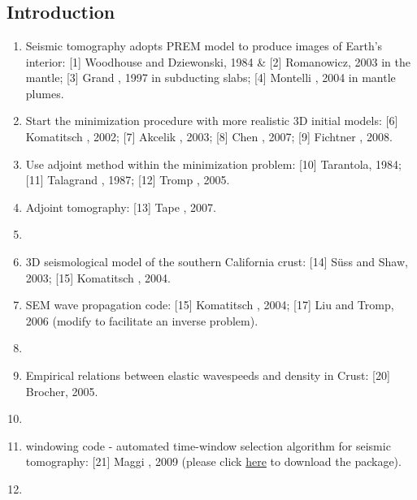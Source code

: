 \renewcommand{\pmk}{Tape\_2009\_S\_Adjoint at SCC}
\renewcommand{\prf}{FWI/\pmk.pdf}
\renewcommand{\pti}{Adjoint tomography of the southern California crust}
\renewcommand{\pay}{Carl Tape, Qinya Liu, and Alessia Maggi \etal, 2009}
\renewcommand{\pjo}{Science}
\renewcommand{\pda}{2016/11/27 Sun.}

\section{\pinfo}
\subsection{Introduction}
\begin{enumerate}[\hspace{10mm}*]
  \item Seismic tomography adopts PREM model to produce images of Earth's interior:
    [1] Woodhouse and Dziewonski, 1984 \& [2] Romanowicz, 2003 in the mantle;
    [3] Grand \etal, 1997 in subducting slabs; [4] Montelli \etal, 2004 in mantle plumes.
  \item Start the minimization procedure with more realistic 3D initial models:
    [6] Komatitsch \etal, 2002; [7] Akcelik \etal, 2003;
    [8] Chen \etal, 2007; [9] Fichtner \etal, 2008.
  \item Use adjoint method within the minimization problem:
    [10] Tarantola, 1984; [11] Talagrand \etal, 1987; [12] Tromp \etal, 2005.
  \item Adjoint tomography: [13] Tape \etal, 2007.
  \item \sline
  \item 3D seismological model of the southern California crust:
    [14] S\"{u}ss and Shaw, 2003; [15] Komatitsch \etal, 2004.
  \item SEM wave propagation code: [15] Komatitsch \etal, 2004;
    [17] Liu and Tromp, 2006 (modify to facilitate an inverse problem).
  \item \sline
  \item Empirical relations between elastic wavespeeds and density in Crust: [20] Brocher, 2005.
  \item \sline
  \item {} windowing code
    - automated time-window selection algorithm for seismic tomography: [21] Maggi \etal, 2009
    (please click \href{http://geodynamics.org/cig/software/flexwin/}{here} to download the package).
  \item \sline

\end{enumerate}
